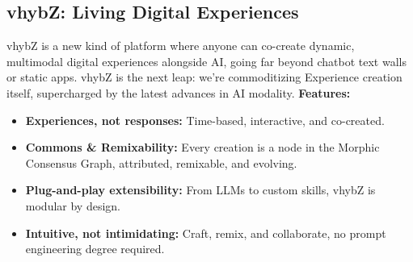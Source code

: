 \documentclass[12pt]{article}
\newcommand{\placeholder}[1]{
  \begin{tikzpicture}
    \node[draw=gray, dashed, text width=0.9\linewidth, align=center, minimum height=2cm] 
    {\footnotesize\textcolor{gray}{Placeholder for: #1}};
  \end{tikzpicture}
}
\begin{document}
\begin{multicols}{2}
\subsection{vhybZ: Living Digital Experiences}
vhybZ is a new kind of platform where anyone can co-create dynamic, multimodal digital experiences alongside AI, going far beyond chatbot text walls or static apps. vhybZ is the next leap: we’re commoditizing Experience creation itself, supercharged by the latest advances in AI modality.
\vspace{0.5em}
\textbf{Features:}
\begin{itemize}[leftmargin=*, itemsep=0pt, topsep=2pt]
  \item \textbf{Experiences, not responses:} Time-based, interactive, and co-created.
  \item \textbf{Commons \& Remixability:} Every creation is a node in the Morphic Consensus Graph, attributed, remixable, and evolving.
  \item \textbf{Plug-and-play extensibility:} From LLMs to custom skills, vhybZ is modular by design.
  \item \textbf{Intuitive, not intimidating:} Craft, remix, and collaborate, no prompt engineering degree required.
\end{itemize}
\vspace{0.5em}
\begin{center}
\end{center}
\vspace{1em}

\columnbreak %


\end{multicols}
\end{document}
